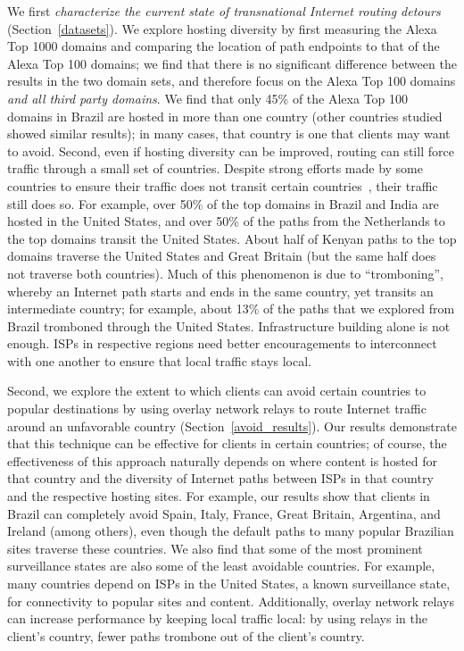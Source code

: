 We first {\em characterize the current state of transnational Internet
routing detours} (Section~\ref{datasets}).  We explore hosting diversity 
by first measuring the Alexa Top 1000 domains and comparing the location of 
path endpoints to that of the Alexa Top 100 domains; we find that there is no 
significant difference between the results in the two domain sets, and therefore 
focus on the Alexa Top 100 domains {\it and all third party domains}.  We find 
that only 45\% of the Alexa Top 100 domains in Brazil are hosted 
in more than one country (other countries studied showed similar results); in many cases,
that country is one that clients may want to avoid. Second, even if
hosting diversity can be improved, routing can still force traffic
through a small set of countries. Despite strong efforts made by some countries to ensure their
traffic does not transit certain countries~\cite{brazil_history,
  brazil_break_from_US, brazil_conference, brazil_conference2,
  brazil_human_rights}, their traffic still does so.  For example, over 50\% of the
top domains in Brazil and India are hosted in the United States, and
over 50\% of the paths from the Netherlands to the top domains transit
the United States.  About half of Kenyan paths to the top domains
traverse the United States and Great Britain (but the same half does not
traverse both countries).  Much of this phenomenon is due to
``tromboning'', whereby an Internet path starts and ends in the same country,
yet transits an intermediate country; for example, about 13\% of the
paths that we explored from Brazil tromboned through the United States.
Infrastructure building alone is not enough. ISPs in respective regions
need better encouragements to interconnect with one another to ensure
that local traffic stays local.

Second, we {explore the extent to which
clients can avoid certain countries to popular destinations} by using overlay network relays to route 
Internet traffic around an unfavorable country (Section~\ref{avoid_results}).  Our results demonstrate that this technique can
be effective for clients in certain countries; of course, the effectiveness of
this approach naturally depends on where content is hosted for that country
and the diversity of Internet paths between ISPs in that country and the
respective hosting sites. For example, our results show that clients in Brazil
can completely avoid Spain, Italy, France, Great Britain, Argentina, and
Ireland (among others), even though the default paths to many popular
Brazilian sites traverse these countries. We also find that some of the most
prominent surveillance states are also some of the least avoidable countries.
For example, many countries depend on ISPs in the United States, a known
surveillance state, for connectivity to popular sites and content.
Additionally, overlay network relays can increase performance by keeping local
traffic local: by using relays in the client's country, fewer paths trombone
out of the client's country.

